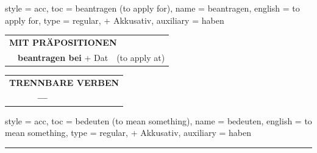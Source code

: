 \begin{verbentry}{
  style = {acc},
  toc = {beantragen (to apply for)},
  name = {beantragen},
  english = {to apply for},
  type = {regular, + Akkusativ},
  auxiliary = {haben}
}
\vspace{10pt}

\begin{tabular}{lll}
\multicolumn{3}{l}{\textbf{MIT PRÄPOSITIONEN}}\\
& \textbf{beantragen bei} + Dat & (to apply at)\\
\end{tabular}
\hfill
\begin{tabular}{lll}
\multicolumn{3}{l}{\textbf{TRENNBARE VERBEN}}\\
& \textbf{---} & \\
\end{tabular}
\vspace{-5pt}
\end{verbentry}

\begin{verbentry}{
  style = {acc},
  toc = {bedeuten (to mean something)},
  name = {bedeuten},
  english = {to mean something},
  type = {regular, + Akkusativ},
  auxiliary = {haben}
}
 
    
     \vspace{5pt}

    \hrule
    
    \vspace{5pt}


\end{verbentry}
